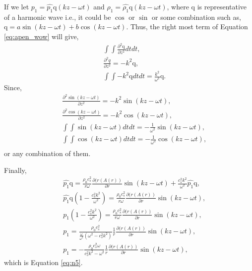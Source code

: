 If we let $p_1=\hat{p_1}\mathrm{q}(kz-\omega t)$ and $\rho_1=\hat{\rho_1}\mathrm{q}(kz-\omega t)$, where $\mathrm{q}$ is representative of a harmonic wave i.e., it could be $\cos$ or $\sin$ or some combination such as, $\mathrm{q} = a \sin(kz-\omega t) + b \cos(kz-\omega t)$.
Thus, the right most term of Equation \ref{eq:apen_wow} will give,
\begin{align}
&&\int\int \frac{\partial^2 \mathrm{q}}{\partial z^2} dt dt,\\
&&\frac{\partial^2 q}{\partial z^2} = - k^2 \mathrm{q},\\
&&\int\int - k^2 \mathrm{q} dt dt = \frac{k^2}{\omega^2}\mathrm{q}.
\end{align}
Since,
\begin{align}
&&\frac{\partial^2 \sin(kz-\omega t)}{\partial z^2} = -k^2\sin(kz-\omega t),\\
&&\frac{\partial^2 \cos(kz-\omega t)}{\partial z^2} = -k^2\cos(kz-\omega t),\\
&&\int\int \sin(kz-\omega t) dt dt = -\frac{1}{\omega^2}\sin(kz-\omega t),\\
&&\int\int \cos(kz-\omega t) dt dt = -\frac{1}{\omega^2}\cos(kz-\omega t),\\
\end{align}
or any combination of them.

Finally,
\begin{align}
&& \hat{p_1}\mathrm{q} = \frac{\rho_0 c_s^2}{r\omega}\frac{\partial(r(A(r))}{\partial r} \sin(kz-\omega t) + \frac{c_s^2 k^2}{\omega^2}\hat{p_1}\mathrm{q},\\
&& \hat{p_1}\mathrm{q}\left(1 - \frac{c_s^2 k^2}{\omega^2} \right) = \frac{\rho_0 c_s^2}{r\omega}\frac{\partial(r(A(r))}{\partial r} \sin(kz-\omega t),\\
&& p_1\left(1 - \frac{c_s^2 k^2}{\omega^2} \right) = \frac{\rho_0 c_s^2}{r\omega}\frac{\partial(r(A(r))}{\partial r} \sin(kz-\omega t),\\
&& p_1 = \frac{\rho_0 c_s^2}{\frac{\omega}{\omega^2}(\omega^2- c_s^2k^2)}\frac{1}{r}\frac{\partial(r(A(r))}{\partial r} \sin(kz-\omega t),\\
&& p_1 = -\frac{\rho_0 c_s^2 \omega}{c_s^2k^2 - \omega^2}\frac{1}{r}\frac{\partial(r(A(r))}{\partial r} \sin(kz-\omega t),
\end{align}
which is Equation \ref{eq:n5}.